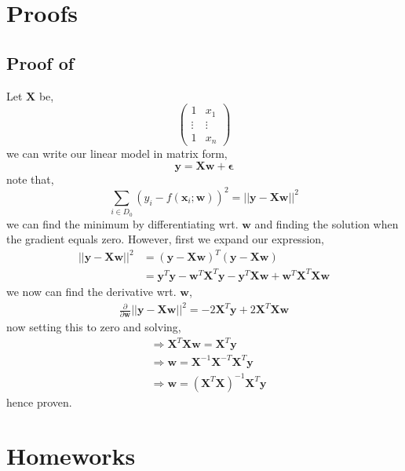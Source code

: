 \begin{appendices}
\section{Proofs}
\subsection{Proof of } \label{proof:wLS solution}
Let $\bm{X}$ be,
\begin{equation}
    \begin{pmatrix}
        1 & x_{1}\\
        \vdots & \vdots \\
        1 & x_{n}
    \end{pmatrix}
\end{equation}
we can write our linear model in matrix form,
\begin{equation}
    \bm{y} = \bm{Xw} + \bm{\epsilon}
\end{equation}
note that,
\begin{equation}
    \sum_{i \in D_{0}} (y_{i} - f(\bm{x}_{i};\bm{w}))^{2}
    = || \bm{y} - \bm{Xw}||^{2}
\end{equation}
we can find the minimum by differentiating wrt. $\bm{w}$ and finding the solution when the gradient equals zero. However, first we expand our expression,
\begin{align}
    || \bm{y} - \bm{Xw}||^{2} 
    {}& = (\bm{y} - \bm{Xw})^{T} (\bm{y}-\bm{Xw}) \\ 
    & = \bm{y}^{T}\bm{y} - \bm{w}^{T} \bm{X}^{T} \bm{y} - \bm{y}^{T}\bm{Xw} + \bm{w}^{T} \bm{X}^{T} \bm{Xw}
\end{align}
we now can find the derivative wrt. $\bm{w}$,
\begin{align}
    \frac{\partial}{\partial \bm{w}} ||\bm{y} - \bm{Xw}||^{2} = -2 \bm{X}^{T} \bm{y} + 2 \bm{X}^{T} \bm{X} \bm{w}
\end{align}
now setting this to zero and solving,
\begin{align}
    {}&\Rightarrow \bm{X}^{T} \bm{X} \bm{w} = \bm{X}^{T} \bm{y} \\
    & \Rightarrow \bm{w} = \bm{X}^{-1} \bm{X}^{-T} \bm{X}^{T} \bm{y} \\
    & \Rightarrow \bm{w} = (\bm{X}^{T} \bm{X})^{-1} \bm{X}^{T} \bm{y}
\end{align}
hence proven.

\section{Homeworks}

\end{appendices}
